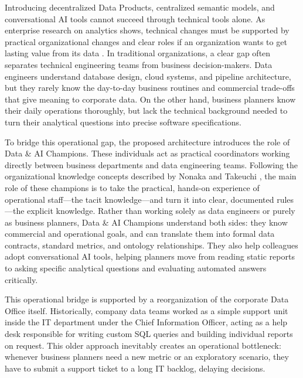 Introducing decentralized Data Products, centralized semantic models, and conversational AI tools cannot succeed through technical tools alone. 
As enterprise research on analytics shows, technical changes must be supported by practical organizational changes and clear roles if an organization wants to get lasting value 
from its data \cite{davenport2017competing}. 
In traditional organizations, a clear gap often separates technical engineering teams from business decision-makers. 
Data engineers understand database design, cloud systems, and pipeline architecture, but they rarely know the day-to-day business routines and commercial trade-offs 
that give meaning to corporate data. On the other hand, business planners know their daily operations thoroughly, but lack the technical background needed to turn their 
analytical questions into precise software specifications.

To bridge this operational gap, the proposed architecture introduces the role of Data \& AI Champions. These individuals act as practical coordinators working directly 
between business departments and data engineering teams. Following the organizational knowledge concepts described by Nonaka and Takeuchi \cite{nonaka1995knowledge}, 
the main role of these champions is to take the practical, hands-on experience of operational staff---the tacit knowledge---and turn it into clear, documented rules
---the explicit knowledge. Rather than working solely as data engineers or purely as business planners, Data \& AI Champions understand both sides: 
they know commercial and operational goals, and can translate them into formal data contracts, standard metrics, and ontology relationships. 
They also help colleagues adopt conversational AI tools, helping planners move from reading static reports to asking specific analytical questions and evaluating automated 
answers critically.

This operational bridge is supported by a reorganization of the corporate Data Office itself. 
Historically, company data teams worked as a simple support unit inside the IT department under the Chief Information Officer, acting as a help desk responsible 
for writing custom SQL queries and building individual reports on request. 
This older approach inevitably creates an operational bottleneck: whenever business planners need a new metric or an exploratory scenario, 
they have to submit a support ticket to a long IT backlog, delaying decisions.

